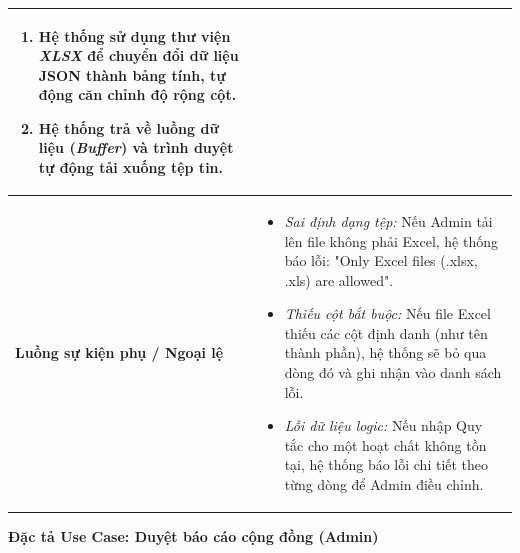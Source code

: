 \documentclass[12pt,a4paper]{article}
\begin{document}
\begin{center}
\begin{tabular}{|p{4cm}|p{10cm}|}
\begin{enumerate}
    \item Hệ thống sử dụng thư viện \textit{XLSX} để chuyển đổi dữ liệu JSON thành bảng tính, tự động căn chỉnh độ rộng cột.
    \item Hệ thống trả về luồng dữ liệu (\textit{Buffer}) và trình duyệt tự động tải xuống tệp tin.
\end{enumerate} \\ \hline
\textbf{Luồng sự kiện phụ / Ngoại lệ} & 
\begin{itemize}
    \item \textit{Sai định dạng tệp:} Nếu Admin tải lên file không phải Excel, hệ thống báo lỗi: "Only Excel files (.xlsx, .xls) are allowed".
    \item \textit{Thiếu cột bắt buộc:} Nếu file Excel thiếu các cột định danh (như tên thành phần), hệ thống sẽ bỏ qua dòng đó và ghi nhận vào danh sách lỗi.
    \item \textit{Lỗi dữ liệu logic:} Nếu nhập Quy tắc cho một hoạt chất không tồn tại, hệ thống báo lỗi chi tiết theo từng dòng để Admin điều chỉnh.
\end{itemize} \\ \hline
\end{tabular}
\end{center}





\vspace{0.5cm}
\textbf{Đặc tả Use Case: Duyệt báo cáo cộng đồng (Admin)}
\end{document}

